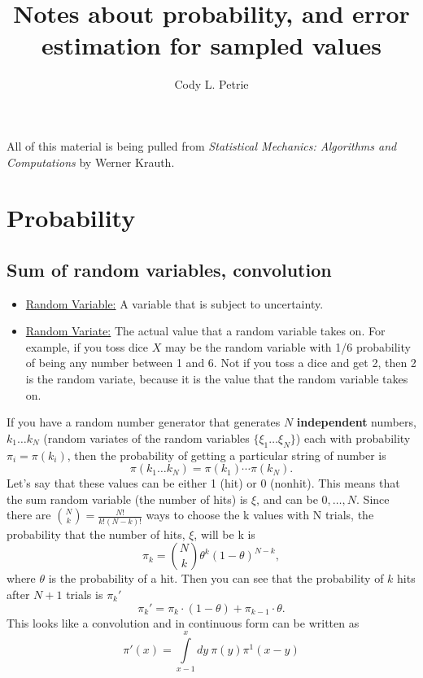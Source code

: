 \documentclass[12pt]{extarticle}
\title{Notes about probability, and error estimation for sampled values}
\author{Cody L. Petrie}
\begin{document}
\maketitle

All of this material is being pulled from \textit{Statistical Mechanics: Algorithms and Computations} by Werner Krauth.

\section{Probability}
\subsection{Sum of random variables, convolution}
\begin{itemize}
   \item \underline{Random Variable:} A variable that is subject to uncertainty.
   \item \underline{Random Variate:} The actual value that a random variable takes on. For example, if you toss dice $X$ may be the random variable with 1/6 probability of being any number between 1 and 6. Not if you toss a dice and get 2, then 2 is the random variate, because it is the value that the random variable takes on.
\end{itemize}
   If you have a random number generator that generates $N$ \textbf{independent} numbers, $k_1 \ldots k_N$ (random variates of the random variables $\{\xi_1\ldots\xi_N\}$) each with probability $\pi_i=\pi(k_i)$, then the probability of getting a particular string of number is
\begin{equation}
   \pi({k_1 \ldots k_N}) = \pi(k_1) \cdots \pi(k_N).
\end{equation}
Let's say that these values can be either 1 (hit) or 0 (nonhit). This means that the sum random variable (the number of hits) is $\xi$, and can be ${0,\ldots,N}$. Since there are ${N \choose k} = \frac{N!}{k!(N-k)!}$ ways to choose the k values with N trials, the probability that the number of hits, $\xi$, will be k is
\begin{equation}
   \pi_k = {N \choose k} \theta^k(1-\theta)^{N-k},
\end{equation}
where $\theta$ is the probability of a hit. Then you can see that the probability of $k$ hits after $N+1$ trials is $\pi_k'$
\begin{equation}
   \pi_k' = \pi_k\cdot(1-\theta)+\pi_{k-1}\cdot\theta.
\end{equation}
This looks like a convolution and in continuous form can be written as
\begin{equation}
   \pi'(x) = \int\limits_{x-1}^xdy~\pi(y)\pi^1(x-y)
\end{equation}
\end{document}
